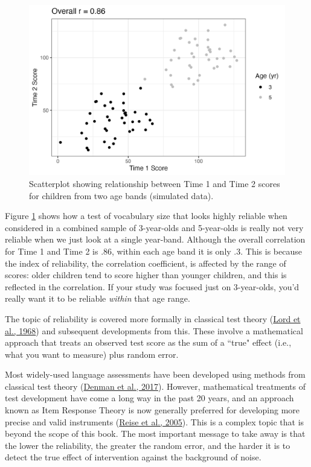 \documentclass{krantz}
\begin{document}
\begin{figure}
\includegraphics[width=0.85\linewidth]{images_bw/reliability-by-age} \caption{Scatterplot showing relationship between Time 1 and Time 2 scores for children from two age bands (simulated data).}\label{fig:reliability-by-age}
\end{figure}

Figure \ref{fig:reliability-by-age} shows how a test of vocabulary size that looks highly reliable when considered in a combined sample of 3-year-olds and 5-year-olds is really not very reliable when we just look at a single year-band. Although the overall correlation for Time 1 and Time 2 is .86, within each age band it is only .3. This is because the index of reliability, the correlation coefficient, is affected by the range of scores: older children tend to score higher than younger children, and this is reflected in the correlation. If your study was focused just on 3-year-olds, you'd really want it to be reliable \emph{within} that age range.

The topic of reliability is covered more formally in classical test theory (\protect\hyperlink{ref-lord1968}{Lord et al., 1968})  and subsequent developments from this. These involve a mathematical approach that treats an observed test score as the sum of a ``true" effect (i.e., what you want to measure) plus random error.

Most widely-used language assessments have been developed using methods from classical test theory (\protect\hyperlink{ref-denman2017}{Denman et al., 2017}). However, mathematical treatments of test development have come a long way in the past 20 years, and an approach known as Item Response Theory is now generally preferred for developing more precise and valid instruments (\protect\hyperlink{ref-reise2005}{Reise et al., 2005}). This is a complex topic that is beyond the scope of this book. The most important message to take away is that the lower the reliability, the greater the random error, and the harder it is to detect the true effect of intervention against the background of noise.
\end{document}
